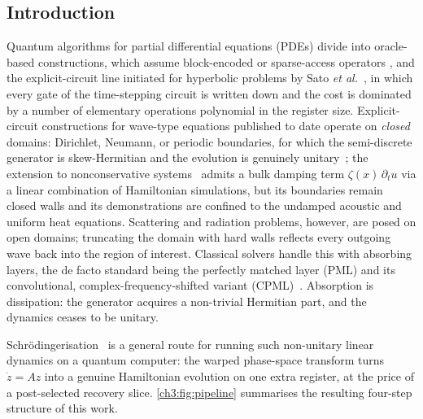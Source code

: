 \subsection{Introduction}
\label{ch3:sec:intro}

Quantum algorithms for partial differential equations (PDEs) divide into
oracle-based constructions, which assume block-encoded or sparse-access
operators \cite{costa2019wave,novikau2023qsvt}, and the explicit-circuit
line initiated for hyperbolic problems by Sato \emph{et
al.}~\cite{sato2024hamiltonian}, in which every gate of the time-stepping
circuit is written down and the cost is dominated by a number of
elementary operations polynomial in the register size.  Explicit-circuit constructions for wave-type equations published to date
operate on \emph{closed} domains: Dirichlet, Neumann, or periodic
boundaries, for which the semi-discrete generator is skew-Hermitian and
the evolution is genuinely
unitary~\cite{sato2024hamiltonian,bosch2025sources}; the extension to
nonconservative systems~\cite{sato2025nonconservative} admits a bulk
damping term $\zeta(x)\,\partial_t u$ via a linear combination of
Hamiltonian simulations, but its boundaries remain closed walls and its
demonstrations are confined to the undamped acoustic and uniform heat
equations.  Scattering and radiation problems,
however, are posed on open domains; truncating the domain with hard walls
reflects every outgoing wave back into the region of interest.  Classical
solvers handle this with absorbing layers, the de facto standard being the
perfectly matched layer (PML) and its convolutional,
complex-frequency-shifted variant
(CPML)~\cite{roden2000cpml,komatitsch2007unsplit,collino2001pml,duru2022pmlreview}.
Absorption is dissipation: the generator acquires a non-trivial Hermitian
part, and the dynamics ceases to be unitary.

Schr\"odingerisation~\cite{jin2023schrodingerisation} is a general route
for running such non-unitary linear dynamics on a quantum computer: the
warped phase-space transform turns $\dot z = Az$ into a genuine
Hamiltonian evolution on one extra register, at the price of a
post-selected recovery slice.  \ref{ch3:fig:pipeline} summarises the
resulting four-step structure of this work.


